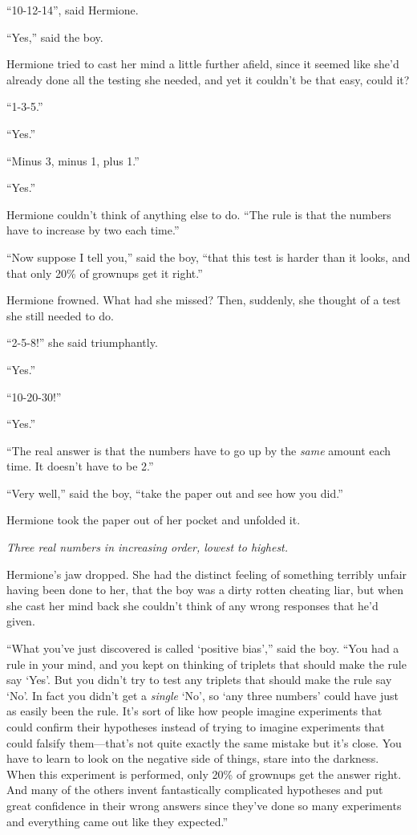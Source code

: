 ``10-12-14'', said Hermione.

``Yes,'' said the boy.

Hermione tried to cast her mind a little further afield, since it seemed
like she'd already done all the testing she needed, and yet it couldn't
be that easy, could it?

``1-3-5.''

``Yes.''

``Minus 3, minus 1, plus 1.''

``Yes.''

Hermione couldn't think of anything else to do. ``The rule is that the
numbers have to increase by two each time.''

``Now suppose I tell you,'' said the boy, ``that this test is harder
than it looks, and that only 20\% of grownups get it right.''

Hermione frowned. What had she missed? Then, suddenly, she thought of a
test she still needed to do.

``2-5-8!'' she said triumphantly.

``Yes.''

``10-20-30!''

``Yes.''

``The real answer is that the numbers have to go up by the \emph{same}
amount each time. It doesn't have to be 2.''

``Very well,'' said the boy, ``take the paper out and see how you did.''

Hermione took the paper out of her pocket and unfolded it.

\emph{Three real numbers in increasing order, lowest to highest.}

Hermione's jaw dropped. She had the distinct feeling of something
terribly unfair having been done to her, that the boy was a dirty rotten
cheating liar, but when she cast her mind back she couldn't think of any
wrong responses that he'd given.

``What you've just discovered is called `positive bias','' said the boy.
``You had a rule in your mind, and you kept on thinking of triplets that
should make the rule say `Yes'. But you didn't try to test any triplets
that should make the rule say `No'. In fact you didn't get a
\emph{single} `No', so `any three numbers' could have just as easily
been the rule. It's sort of like how people imagine experiments that
could confirm their hypotheses instead of trying to imagine experiments
that could falsify them---that's not quite exactly the same mistake but
it's close. You have to learn to look on the negative side of things,
stare into the darkness. When this experiment is performed, only 20\% of
grownups get the answer right. And many of the others invent
fantastically complicated hypotheses and put great confidence in their
wrong answers since they've done so many experiments and everything came
out like they expected.''


